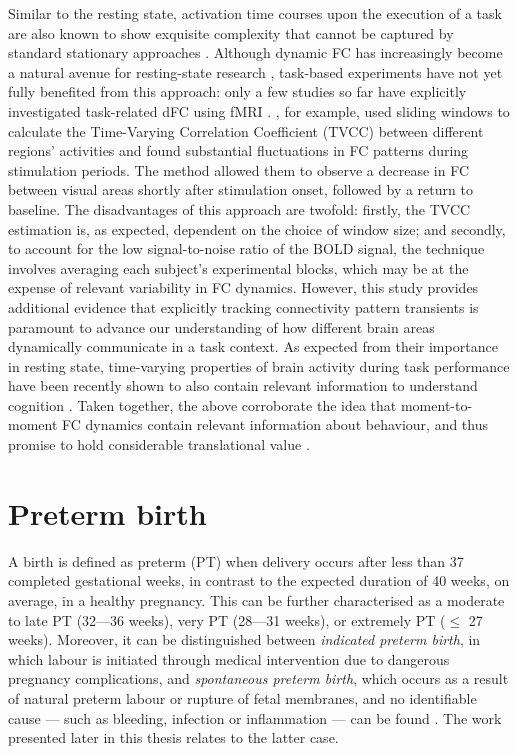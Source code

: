 Similar to the resting state, activation time courses upon the execution of a task are also known to show exquisite complexity that cannot be captured by standard stationary approaches \citep{Gonzalez-Castillo2018}. Although dynamic FC has increasingly become a natural avenue for resting-state research \citep{Preti2017}, task-based experiments have not yet fully benefited from this approach: only a few studies so far have explicitly investigated task-related dFC using fMRI \cite{Braun2015, Di2015, Simony2016}. \cite{Di2015}, for example, used sliding windows to calculate the Time-Varying Correlation Coefficient (TVCC) between different regions’ activities and found substantial fluctuations in FC patterns during stimulation periods. The method allowed them to observe a decrease in FC between visual areas shortly after stimulation onset, followed by a return to baseline. The disadvantages of this approach are twofold: firstly, the TVCC estimation is, as expected, dependent on the choice of window size; and secondly, to account for the low signal-to-noise ratio of the BOLD signal, the technique involves averaging each subject’s experimental blocks, which may be at the expense of relevant variability in FC dynamics. However, this study provides additional evidence that explicitly tracking connectivity pattern transients is paramount to advance our understanding of how different brain areas dynamically communicate in a task context. As expected from their importance in resting state, time-varying properties of brain activity during task performance have been recently shown to also contain relevant information to understand cognition \citep{Fong2019}. Taken together, the above corroborate the idea that moment-to-moment FC dynamics contain relevant information about behaviour, and thus promise to hold considerable translational value \citep{ Gonzalez-Castillo2018}.


\section{Preterm birth}\label{sub:preterm}

A birth is defined as preterm (PT) when delivery occurs after less than 37 completed gestational weeks, in contrast to the expected duration of 40 weeks, on average, in a healthy pregnancy. This can be further characterised as a moderate to late PT (32---36 weeks), very PT (28---31 weeks),  or extremely PT ($\leq$ 27 weeks). Moreover, it can be distinguished between \textit{indicated preterm birth}, in which labour is initiated through medical intervention due to dangerous pregnancy complications, and \textit{spontaneous preterm birth}, which occurs as a result of natural preterm labour or rupture of fetal membranes, and no identifiable cause --- such as bleeding, infection or inflammation --- can be found  \citep{Behrman2007}. The work presented later in this thesis relates to the latter case. 



